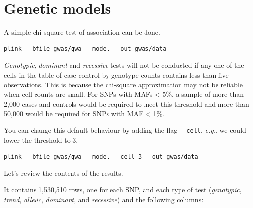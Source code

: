 \documentclass[
]{book}
\newenvironment{Shaded}{\begin{snugshade}}{\end{snugshade}}
\newcommand{\DecValTok}[1]{\textcolor[rgb]{0.00,0.00,0.81}{#1}}
\newcommand{\FunctionTok}[1]{\textcolor[rgb]{0.00,0.00,0.00}{#1}}
\newcommand{\NormalTok}[1]{#1}
\newcommand{\OtherTok}[1]{\textcolor[rgb]{0.56,0.35,0.01}{#1}}
\newcommand{\SpecialCharTok}[1]{\textcolor[rgb]{0.00,0.00,0.00}{#1}}
\newcommand{\StringTok}[1]{\textcolor[rgb]{0.31,0.60,0.02}{#1}}
\begin{document}
\hypertarget{genetic-models}{%
\section{Genetic models}\label{genetic-models}}

A simple chi-square test of association can be done.

\begin{verbatim}
plink --bfile gwas/gwa --model --out gwas/data
\end{verbatim}

\emph{Genotypic}, \emph{dominant} and \emph{recessive} tests will not be conducted if any one of the cells in the table of case-control by genotype counts contains less than five observations. This is because the chi-square approximation may not be reliable when cell counts are small. For SNPs with MAFs \textless{} 5\%, a sample of more than 2,000 cases and controls would be required to meet this threshold and more than 50,000 would be required for SNPs with MAF \textless{} 1\%.

You can change this default behaviour by adding the flag \texttt{-\/-cell}, \emph{e.g.}, we could lower the threshold to 3.

\begin{verbatim}
plink --bfile gwas/gwa --model --cell 3 --out gwas/data
\end{verbatim}

Let's review the contents of the results.

\begin{Shaded}
\end{Shaded}

It contains 1,530,510 rows, one for each SNP, and each type of test (\emph{genotypic}, \emph{trend}, \emph{allelic}, \emph{dominant}, and \emph{recessive}) and the following columns:
\end{document}
